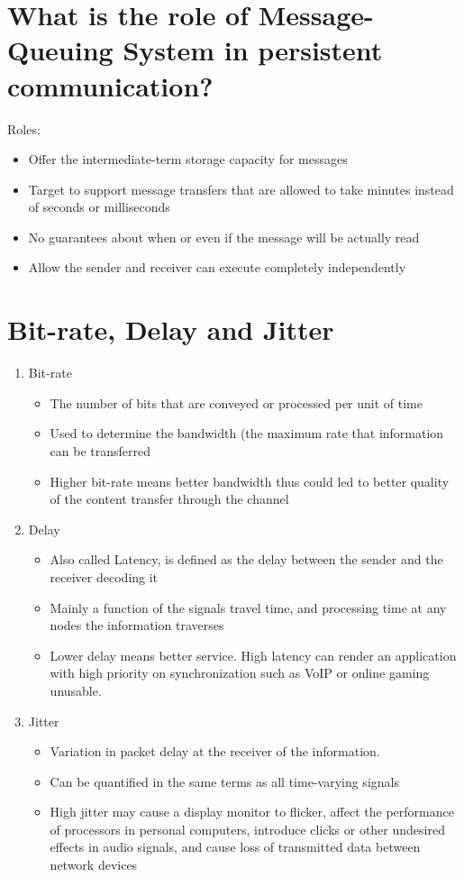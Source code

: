 \documentclass[11pt,a4paper]{report}
\begin{document}
	\section{What is the role of Message-Queuing System in persistent communication?}
	Roles:
	\begin{itemize}
		\item Offer the intermediate-term storage capacity for messages
		\item Target to support message transfers that are allowed to take minutes instead of seconds or milliseconds
		\item No guarantees about when or even if the message will be actually read
		\item Allow the sender and receiver can execute completely independently
	\end{itemize}
	
	\section{Bit-rate, Delay and Jitter}
	\begin{enumerate}
		\item Bit-rate
			\begin{itemize}
				\item The number of bits that are conveyed or processed per unit of time
				\item Used to determine the bandwidth (the maximum rate that information can be transferred
				\item Higher bit-rate means better bandwidth thus could led to better quality of the content transfer through the channel
			\end{itemize}
		\item Delay
			\begin{itemize}
				\item Also called Latency, is defined as the delay between the sender and the receiver decoding it
				\item Mainly a function of the signals travel time, and processing time at any nodes the information traverses
				\item Lower delay means better service. High latency can render an application with high priority on synchronization such as VoIP or online gaming unusable.
			\end{itemize}
		\item Jitter
			\begin{itemize}
				\item Variation in packet delay at the receiver of the information.
				\item Can be quantified in the same terms as all time-varying signals
				\item High jitter may cause a display monitor to flicker, affect the performance of processors in personal computers, introduce clicks or other undesired effects in audio signals, and cause loss of transmitted data between network devices
			\end{itemize}
	\end{enumerate}
	
\end{document}
